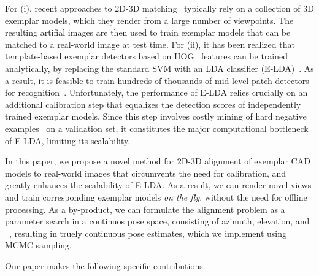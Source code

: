 For (i), recent approaches to 2D-3D matching~\cite{Aubry14, Lim14}
typically rely on a
collection of 3D exemplar models, which they render from a
large number of viewpoints. The resulting artifial images are then
used to train exemplar models that can be matched to a real-world
image at test time.
%
For (ii), it has been realized that template-based exemplar detectors
based on HOG~\cite{Dalal05} features can be trained analytically, by
replacing the standard SVM with an LDA classifier
(E-LDA)~\cite{Hariharan12}. As a result, it is feasible to train
hundreds of thousands of mid-level patch detectors for
recognition~\cite{Aubry14}.
%
Unfortunately, the performance of E-LDA relies crucially on an
additional calibration step that equalizes the detection scores of
independently trained exemplar models. Since this step involves costly
mining of hard negative examples~\cite{Dalal05,Felzenszwalb10} on a
validation set, it constitutes the major computational bottleneck of
E-LDA, limiting its scalability.

In this paper, we propose a novel method for 2D-3D alignment of
exemplar CAD models to real-world images that circumvents the need for
calibration, and greatly enhances the scalability of E-LDA. As a
result, we can render novel views and train corresponding exemplar
models {\em on the fly}, without the need for offline processing. As a
by-product, we can formulate the alignment problem as a parameter
search in a continuos pose space, consisting of azimuth, elevation,
and ~\scream{}, resulting in truely continuous pose estimates, which
we implement using MCMC sampling.
%

Our paper makes the following specific contributions.

